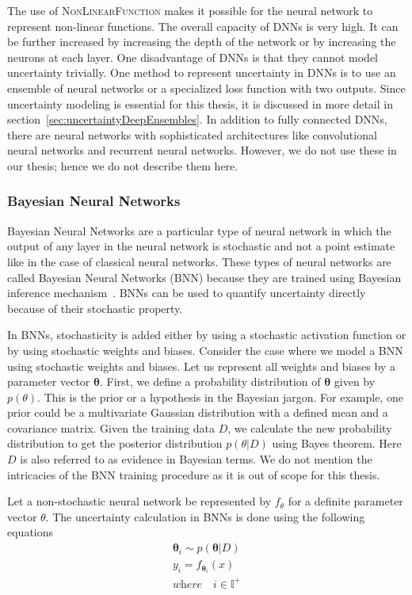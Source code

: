 \documentclass[12pt, twoside, ngerman]{report}
\begin{document}
The use of \textsc{NonLinearFunction} makes it possible for the neural network to represent non-linear functions.
The overall capacity of DNNs is very high. It can be further increased by increasing the depth of the network or by increasing the neurons at each layer.
One disadvantage of DNNs is that they cannot model uncertainty trivially.
One method to represent uncertainty in DNNs is to use an ensemble of neural networks or a specialized loss function with two outputs.
Since uncertainty modeling is essential for this thesis, it is discussed in more detail in section~\ref{sec:uncertaintyDeepEnsembles}.
In addition to fully connected DNNs, there are neural networks with sophisticated architectures like convolutional neural networks and recurrent neural networks. However, we do not use these in our thesis; hence we do not describe them here.

\subsubsection{Bayesian Neural Networks}
Bayesian Neural Networks are a particular type of neural network in which the output of any layer in the neural network is stochastic and not a point estimate like in the case of classical neural networks.
These types of neural networks are called Bayesian Neural Networks (BNN) because they are trained using Bayesian inference mechanism~\cite{BayesianNeuralNetworks}.
BNNs can be used to quantify uncertainty directly because of their stochastic property.

In BNNs, stochasticity is added either by using a stochastic activation function or by using stochastic weights and biases.
Consider the case where we model a BNN using stochastic weights and biases.
Let us represent all weights and biases by a parameter vector $\mathbf{\theta}$.
First, we define a probability distribution of $\mathbf{\theta}$ given by  $p(\theta)$.
This is the prior or a hypothesis in the Bayesian jargon.
For example, one prior could be a multivariate Gaussian distribution with a defined mean and a covariance matrix.
Given the training data $D$,  we calculate the new probability distribution to get the posterior distribution $p(\theta | D)$ using Bayes theorem.
Here $D$ is also referred to as evidence in Bayesian terms.
We do not mention the intricacies of the BNN training procedure as it is out of scope for this thesis.

Let a non-stochastic neural network be represented by $f_{\theta}$ for a definite parameter vector $\theta$. 
The uncertainty calculation in BNNs is done using the following equations
\begin{align*}
\mathbf{\theta}_i \sim p(\mathbf{\theta}| D)  \\
y_i = f_{\mathbf{\theta}_i}(x) \\
\textit{where} \quad i \in \mathbb{I}^+
\end{align*}
\end{document}
